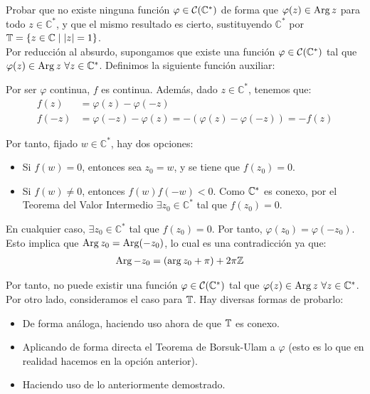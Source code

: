 \begin{ejercicio}
    Probar que no existe ninguna función $\varphi \in \mathcal{C}(\mathbb{C}^\ast)$ de forma que $\varphi(z) \in \operatorname{Arg} z$ para todo $z \in \mathbb{C}^\ast$, y que el mismo resultado es cierto, sustituyendo $\mathbb{C}^\ast$ por $\mathbb{T} = \{z \in \mathbb{C} \mid |z| = 1\}$.\\

    Por reducción al absurdo, supongamos que existe una función $\varphi\in \mathcal{C}(\mathbb{C}^{\ast})$ tal que $\varphi(z)\in \operatorname{Arg} z~\forall z\in \mathbb{C}^{\ast}$. Definimos la siguiente función auxiliar:

    Por ser $\varphi$ continua, $f$ es continua. Además, dado $z\in \mathbb{C}^{\ast}$, tenemos que:
    \begin{align*}
        f(z) &= \varphi(z)-\varphi(-z)\\
        f(-z) &= \varphi(-z)-\varphi(z) = -(\varphi(z)-\varphi(-z)) = -f(z)
    \end{align*}

    Por tanto, fijado $w\in \mathbb{C}^{\ast}$, hay dos opciones:
    \begin{itemize}
        \item Si $f(w)=0$, entonces sea $z_0=w$, y se tiene que $f(z_0)=0$.
        \item Si $f(w)\neq 0$, entonces $f(w)f(-w)<0$. Como $\mathbb{C}^{\ast}$ es conexo, por el Teorema del Valor Intermedio $\exists z_0\in \mathbb{C}^{\ast}$ tal que $f(z_0)=0$.
    \end{itemize}
    En cualquier caso, $\exists z_0\in \mathbb{C}^{\ast}$ tal que $f(z_0)=0$. Por tanto, $\varphi(z_0)=\varphi(-z_0)$. Esto implica que $\operatorname{Arg} z_0 = \operatorname{Arg} (-z_0)$, lo cual es una contradicción ya que:
    \begin{align*}
        \operatorname{Arg} -z_0 &= (\arg z_0 + \pi) + 2\pi\mathbb{Z}
    \end{align*}

    Por tanto, no puede existir una función $\varphi\in \mathcal{C}(\mathbb{C}^{\ast})$ tal que $\varphi(z)\in \operatorname{Arg} z~\forall z\in \mathbb{C}^{\ast}$.\\

    Por otro lado, consideramos el caso para $\mathbb{T}$. Hay diversas formas de probarlo:
    \begin{itemize}
        \item De forma análoga, haciendo uso ahora de que $\mathbb{T}$ es conexo.
        \item Aplicando de forma directa el Teorema de Borsuk-Ulam a $\varphi$ (esto es lo que en realidad hacemos en la opción anterior).
        \item Haciendo uso de lo anteriormente demostrado.
    \end{itemize}


\end{ejercicio}

